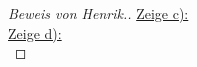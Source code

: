 \documentclass[12pt,a4paper]{article}
\begin{document}
\begin{proof}[Beweis von Henrik.]
\underline{Zeige c):}\\

\underline{Zeige d):}\\
\end{proof}
\end{document}
